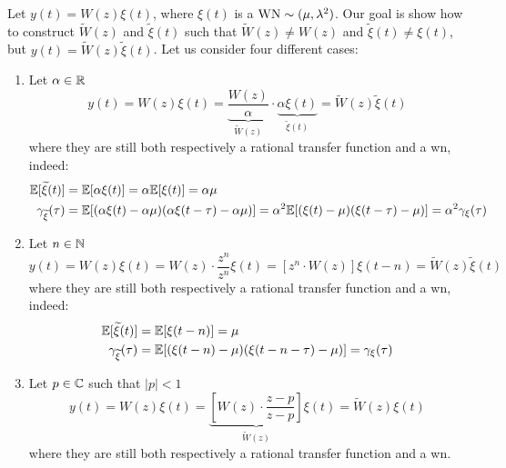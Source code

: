 Let $y(t)=W(z)\xi(t)$, where $\xi(t)$ is a $\operatorname{WN}\sim(\mu,\lambda^2)$. Our goal is show how to construct $\tilde{W}(z)$ and $\tilde{\xi}(t)$ such that $\tilde{W}(z)\neq W(z)$ and $\tilde{\xi}(t)\neq \xi(t)$, but $y(t)=\tilde W(z)\tilde\xi(t)$. Let us consider four different cases:
\begin{enumerate}
	\item 
	Let $\alpha \in \mathbb{R}$
	\[
		y(t)=W(z) \xi(t) = \underbrace{\frac{W(z)}{\alpha}}_{\tilde{W}(z)} \cdot \underbrace{\alpha \xi(t)}_{\tilde{\xi}(t)} = \tilde{W}(z)\tilde{\xi}(t)
	\]
	where they are still both respectively a rational transfer function and a \gls{wn}, indeed:
	\begin{align*}
		\mathbb{E}[\widetilde{\xi}(t)]&=\mathbb{E}[\alpha \xi(t)]=\alpha \mathbb{E}[\xi(t)]=\alpha \mu\\
		\gamma_{\widetilde{\xi}}(\tau)&=\mathbb{E}[(\alpha\xi(t)-\alpha\mu)(\alpha \xi(t-\tau)-\alpha \mu)]=\alpha^2 \mathbb{E}[(\xi(t)-\mu)( \xi(t-\tau)- \mu)] = \alpha^2 \gamma_{\xi}(\tau)
	\end{align*}

	\item 
	Let $n \in \mathbb{N}$
	\[
		y(t)=W(z) \xi(t)=W(z) \cdot \frac{z^{n}}{z^{n}} \xi(t)=\left[z^{n} \cdot W(z)\right] \xi(t-n)=\tilde{W}(z) \tilde{\xi}(t)
	\]
	where they are still both respectively a rational transfer function and a \gls{wn}, indeed:
	\begin{align*}
		\mathbb{E}[\widetilde{\xi}(t)]&=\mathbb{E}[\xi(t-n)]=\mu \\
		\gamma_{\widetilde{\xi}}(\tau)&=\mathbb{E}[(\xi(t-n)-\mu)(\xi(t-n-\tau)-\mu)]=\gamma_{\xi}(\tau)
	\end{align*}

	\item 
	Let $p \in \mathbb{C}$ such that $|p|<1$
	\[
		y(t)=W(z) \xi(t) = \underbrace{\left[W(z) \cdot \frac{z-p}{z-p}\right]}_{\tilde{W}(z)} \xi(t)=\tilde{W}(z) \xi(t)
	\]
	where they are still both respectively a rational transfer function and a \gls{wn}.


\end{enumerate}
